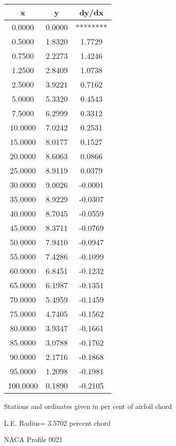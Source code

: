 \documentclass[11pt]{book}
\begin{document}
 \vspace{8mm}
 \begin{tabular}{|c|c|c|} \hline 
  x  &  y  &  dy/dx \\
 \hline
0.0000 & 0.0000 & ******** \\
0.5000 & 1.8320 & 1.7729 \\
0.7500 & 2.2273 & 1.4246 \\
1.2500 & 2.8409 & 1.0738 \\
2.5000 & 3.9221 & 0.7162 \\
5.0000 & 5.3320 & 0.4543 \\
7.5000 & 6.2999 & 0.3312 \\
10.0000 & 7.0242 & 0.2531 \\
15.0000 & 8.0177 & 0.1527 \\
20.0000 & 8.6063 & 0.0866 \\
25.0000 & 8.9119 & 0.0379 \\
30.0000 & 9.0026 & -0.0001 \\
35.0000 & 8.9229 & -0.0307 \\
40.0000 & 8.7045 & -0.0559 \\
45.0000 & 8.3711 & -0.0769 \\
50.0000 & 7.9410 & -0.0947 \\
55.0000 & 7.4286 & -0.1099 \\
60.0000 & 6.8451 & -0.1232 \\
65.0000 & 6.1987 & -0.1351 \\
70.0000 & 5.4959 & -0.1459 \\
75.0000 & 4.7405 & -0.1562 \\
80.0000 & 3.9347 & -0.1661 \\
85.0000 & 3.0788 & -0.1762 \\
90.0000 & 2.1716 & -0.1868 \\
95.0000 & 1.2098 & -0.1981 \\
100.0000 & 0.1890 & -0.2105 \\
 \hline
 \end{tabular}
 \vspace{8mm}


Stations and ordinates given in per cent of airfoil chord 


L.E. Radius=  3.5702 percent chord
 \newpage
  \label{p0021}
 \begin{Large}
 NACA Profile 0021
 \end{Large}
  
\end{document}
